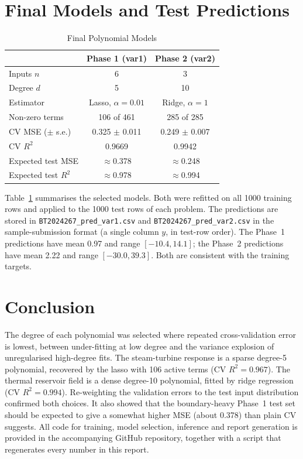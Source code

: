 \documentclass[conference]{IEEEtran}
\begin{document}
\section{Final Models and Test Predictions}\label{sec:final}
\begin{table}[!t]
\renewcommand{\arraystretch}{1.12}
\caption{Final Polynomial Models}
\label{tab:final}
\centering\footnotesize
\setlength{\tabcolsep}{3.6pt}
\begin{tabular}{@{}lcc@{}}
\toprule
 & Phase 1 (var1) & Phase 2 (var2) \\
\midrule
Inputs $n$ & 6 & 3 \\
Degree $d$ & 5 & 10 \\
Estimator & Lasso, $\alpha{=}0.01$ & Ridge, $\alpha{=}1$ \\
Non-zero terms & 106 of 461 & 285 of 285 \\
CV MSE ($\pm$ s.e.) & 0.325 $\pm$ 0.011 & 0.249 $\pm$ 0.007 \\
CV $R^2$ & 0.9669 & 0.9942 \\
Expected test MSE & $\approx$0.378 & $\approx$0.248 \\
Expected test $R^2$ & $\approx$0.978 & $\approx$0.994 \\
\bottomrule
\end{tabular}
\end{table}
Table~\ref{tab:final} summarises the selected models. Both were refitted on all 1000 training rows and applied to the 1000 test rows of each problem. The predictions are stored in \texttt{BT2024267\_pred\_var1.csv} and \texttt{BT2024267\_pred\_var2.csv} in the sample-submission format (a single column $y$, in test-row order). The Phase~1 predictions have mean 0.97 and range $[-10.4, 14.1]$; the Phase~2 predictions have mean 2.22 and range $[-30.0, 39.3]$. Both are consistent with the training targets.

\section{Conclusion}
The degree of each polynomial was selected where repeated cross-validation error is lowest, between under-fitting at low degree and the variance explosion of unregularised high-degree fits. The steam-turbine response is a sparse degree-5 polynomial, recovered by the lasso with 106 active terms (CV $R^2=0.967$). The thermal reservoir field is a dense degree-10 polynomial, fitted by ridge regression (CV $R^2=0.994$). Re-weighting the validation errors to the test input distribution confirmed both choices. It also showed that the boundary-heavy Phase~1 test set should be expected to give a somewhat higher MSE (about 0.378) than plain CV suggests. All code for training, model selection, inference and report generation is provided in the accompanying GitHub repository, together with a script that regenerates every number in this report.
\end{document}
